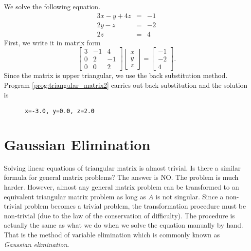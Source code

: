 \bigskip
\begin{example}
We solve the following equation.
\begin{subequations}
\begin{eqnarray} \label{eq:bs}
3 x - y + 4 z &=& -1\label{eq:bs1} \\
2 y -z &=& -2\label{eq:bs2}\\
2z &=& 4 \label{eq:bs3}
\end{eqnarray}
\end{subequations}
First, we write it in  matrix form
\begin{equation}
\begin{bmatrix}
3 & -1 & 4 \\ 0 & 2 & -1 \\ 0 & 0& 2
\end{bmatrix}
\begin{bmatrix}
x \\ y \\ z
\end{bmatrix}
=
\begin{bmatrix}
-1 \\ -2 \\ 4
\end{bmatrix}.
\end{equation}
Since the matrix is upper triangular, we use the back substitution method. Program \ref{prog:triangular_matrix2} carries out back substitution and the solution is

\medskip
\begin{mybox}
   
   \medskip
   \begin{verbatim}
      x=-3.0, y=0.0, z=2.0
   \end{verbatim}
\end{mybox}
\end{example}

\noindent
\section{Gaussian Elimination}

Solving linear equations of triangular matrix is almost trivial. Is there a similar formula for general matrix problems?  The answer is NO.  The problem is much harder.  However, almost any general matrix problem can be transformed to an equivalent triangular matrix problem as long as $A$ is not singular.  Since a non-trivial problem becomes a trivial problem, the transformation procedure must be non-trivial (due to the law of the conservation of difficulty).  The procedure is actually the same as what we do when we solve the equation manually by hand. That is the method of variable elimination which is commonly known as \emph{Gaussian elimination}.

